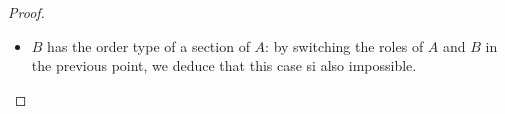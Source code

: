 \documentclass[11pt,a4paper,twoside]{article}
\theoremstyle{definition}
\begin{document}
\begin{proof}
\begin{enumerate}[(a)]
\begin{itemize}
          \item $B$ has the order type of a section of $A$: by switching the roles of $A$ and $B$ in the previous point, we deduce
            that this case si also impossible.

      \end{itemize}

  \end{enumerate}

\end{proof}
\end{document}
